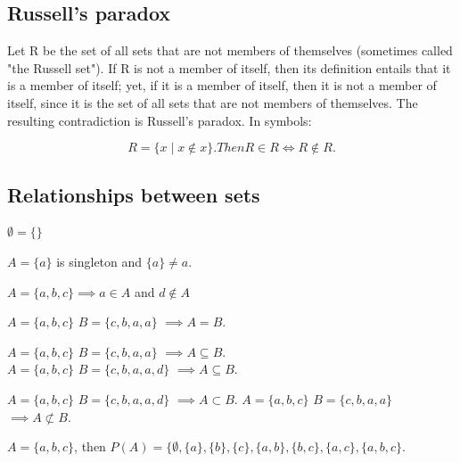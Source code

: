 \subsection{Russell's paradox}
{\color{sol}
Let R be the set of all sets that are not members of themselves (sometimes called "the Russell set"). If R is not a member of itself, then its definition entails that it is a member of itself; yet, if it is a member of itself, then it is not a member of itself, since it is the set of all sets that are not members of themselves. The resulting contradiction is Russell's paradox. In symbols:
}

    $$ R=\{x\mid x\not \in x\}.Then {R\in R\iff R\not \in R.}$$

\subsection{Relationships between sets}
\begin{definition}
  $\emptyset = \{  \}$
\end{definition}

\begin{definition}[Singleton $\{ a \}$]
  $A = \{a\}$ is singleton and $\{ a \} \neq a$.
\end{definition}

\begin{definition}
  $A = \{a, b, c\} \implies a \in A$ and $d \notin A$
\end{definition}

\begin{definition}[Set equality $A=B$]
  $A = \{a, b, c\}$ $B=\{c, b, a, a\}$ $\implies A=B$.
\end{definition}

\begin{definition}
  $A = \{a, b, c\}$ $B=\{c, b, a, a\}$ $\implies A\subseteq B$.\\
  $A = \{a, b, c\}$ $B=\{c, b, a, a, d\}$ $\implies A\subseteq B$.
\end{definition}

\begin{definition}
  $A = \{a, b, c\}$ $B=\{c, b, a, a, d\}$ $\implies A\subset B$.
  $A = \{a, b, c\}$ $B=\{c, b, a, a\}$ $\implies A \not\subset B$.\\
\end{definition}

\begin{definition}
  $A = \{a,b, c\}$, then $P(A) = \{\emptyset, \{a\}, \{b\}, \{c\}, \{a, b\}, \{b, c\}, \{a, c\}, \{a, b, c\}$.
\end{definition}


